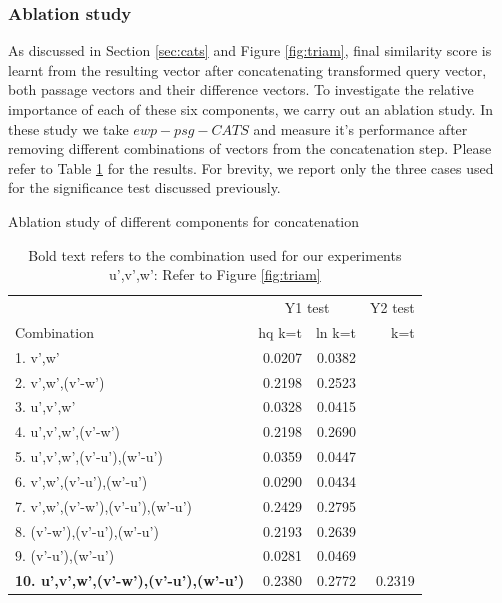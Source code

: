 \documentclass[sigconf,authordraft]{acmart}
\begin{document}
\subsubsection{Ablation study} As discussed in Section \ref{sec:cats} and Figure \ref{fig:triam}, final similarity score is learnt from the resulting vector after concatenating transformed query vector, both passage vectors and their difference vectors. To investigate the relative importance of each of these six components, we carry out an ablation study. In these study we take $ewp-psg-CATS$ and measure it's performance after removing different combinations of vectors from the concatenation step. Please refer to Table \ref{tab:abl} for the results. For brevity, we report only the three cases used for the significance test discussed previously. 

\begin{table}[t]
\centering
\caption{Ablation study of different components for concatenation}
\label{tab:abl}
\begin{tabular}{@{}lrrr@{}}\toprule
& \multicolumn{2}{c}{Y1 test} & Y2 test  \\
\cmidrule(r){2-3}
\cmidrule(r){4-4}
Combination & hq k=t & ln k=t & k=t \\\midrule
1. v',w' & 0.0207 & 0.0382 &  \\ 
2. v',w',(v'-w') & 0.2198 & 0.2523 & \\
3. u',v',w' & 0.0328 & 0.0415 & \\
4. u',v',w',(v'-w') & 0.2198 & 0.2690 & \\
5. u',v',w',(v'-u'),(w'-u') & 0.0359 & 0.0447 & \\
6. v',w',(v'-u'),(w'-u') & 0.0290 & 0.0434 & \\
7. v',w',(v'-w'),(v'-u'),(w'-u') & 0.2429 & 0.2795 & \\
8. (v'-w'),(v'-u'),(w'-u') & 0.2193 & 0.2639 & \\
9. (v'-u'),(w'-u') & 0.0281 & 0.0469 & \\
\textbf{10. u',v',w',(v'-w'),(v'-u'),(w'-u')} & 0.2380 & 0.2772 & 0.2319 \\
\bottomrule
\end{tabular}
\caption*{Bold text refers to the combination used for our experiments \\
u',v',w': Refer to Figure \ref{fig:triam}}
\end{table}
\end{document}
